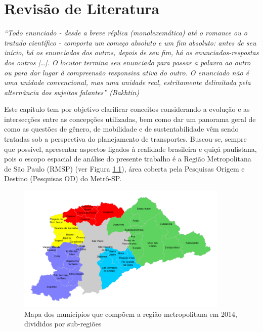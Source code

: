 \chapter{Revisão de Literatura}\label{chap:revisao-literatura}
\begin{citacao}
	\begin{flushright}  
\emph{``Todo enunciado - desde a breve réplica (monolexemática) até o romance ou o tratado científico - comporta um começo absoluto e um fim absoluto: antes de seu início, há os enunciados dos outros, depois de seu fim, há os enunciados-respostas dos outros [\ldots]. O locutor termina seu enunciado para passar a palavra ao outro ou para dar lugar à compreensão responsiva ativa do outro. O enunciado não é uma unidade convencional, mas uma unidade real, estritamente delimitada pela alternância dos sujeitos falantes'' (Bakhtin)}
	\end{flushright}
\end{citacao}

Este capítulo tem por objetivo clarificar conceitos considerando a evolução e as intersecções entre as concepções utilizadas, bem como dar um panorama geral de como as questões de gênero, de mobilidade e de sustentabilidade vêm sendo tratadas sob a perspectiva do planejamento de transportes. 
Buscou-se, sempre que possível, apresentar aspectos ligados à realidade brasileira e quiçá paulistana, pois o escopo espacial de análise do presente trabalho é a Região Metropolitana de São Paulo (RMSP) (ver Figura \ref{fig:mapa-rmsp}), área coberta pela Pesquisas Origem e Destino (Pesquisas OD) do Metrô-SP. 

\begin{figure}[htb]%
    \caption{\label{fig:mapa-rmsp}Mapa dos municípios que compõem a região metropolitana em 2014, divididos por sub-regiões}%
    \begin{center}%
        \includegraphics[width=0.9\textwidth]{./imagens/Mapa-RMSP-subregions.png}%
    \end{center}%
\end{figure}%

